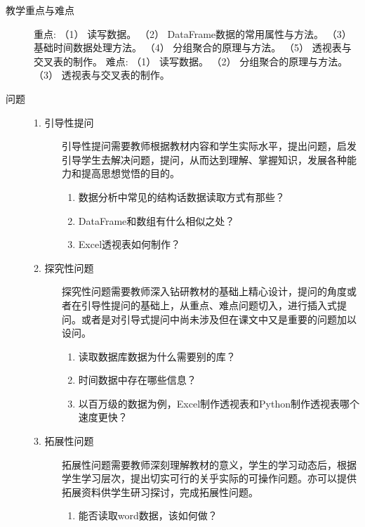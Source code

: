 \documentclass[12pt,a4paper,openany,cap]{ctexbook}
\begin{document}
\begin{description}
\item[教学重点与难点]    重点:
    （1） 读写数据。
    （2） DataFrame数据的常用属性与方法。
    （3） 基础时间数据处理方法。
    （4） 分组聚合的原理与方法。
    （5） 透视表与交叉表的制作。
             难点:
    （1） 读写数据。
    （2） 分组聚合的原理与方法。
    （3） 透视表与交叉表的制作。
  \item[问题]
    \begin{minipage}[t]{0.8\linewidth}
      \begin{description}
      \item[ 1. 引导性提问]
引导性提问需要教师根据教材内容和学生实际水平，提出问题，启发引导学生去解决问题，提问，从而达到理解、掌握知识，发展各种能力和提高思想觉悟的目的。
\begin{enumerate}
\item     数据分析中常见的结构话数据读取方式有那些？
\item\label{item:113}  DataFrame和数组有什么相似之处？
\item\label{item:114}  Excel透视表如何制作？
\end{enumerate}
\item[2. 探究性问题] 
探究性问题需要教师深入钻研教材的基础上精心设计，提问的角度或者在引导性提问的基础上，从重点、难点问题切入，进行插入式提问。或者是对引导式提问中尚未涉及但在课文中又是重要的问题加以设问。
\begin{enumerate}
\item   读取数据库数据为什么需要别的库？
\item\label{item:115}  时间数据中存在哪些信息？
\item\label{item:116}  以百万级的数据为例，Excel制作透视表和Python制作透视表哪个速度更快？
\end{enumerate}
\item[3. 拓展性问题] 
拓展性问题需要教师深刻理解教材的意义，学生的学习动态后，根据学生学习层次，提出切实可行的关乎实际的可操作问题。亦可以提供拓展资料供学生研习探讨，完成拓展性问题。
\begin{enumerate}
\item  能否读取word数据，该如何做？
\end{enumerate}
\end{description}
    \end{minipage}


\end{description}
\end{document}
